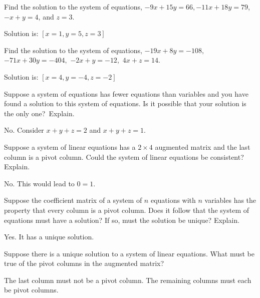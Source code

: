\begin{enumialphparenastyle}
\begin{ex} Find the solution to the system of equations, 
$-9x+15y=66,-11x+18y=79$, $-x+y=4$, and $z=3$.
\begin{sol}
Solution is: $\left[x=1,y=5,z=3\right] $
\end{sol}
\end{ex}

\begin{ex} Find the solution to the system of equations, $-19x+8y=-108,$
$-71x+30y=-404,$ $-2x+y=-12,$ $4x+z=14.$
\begin{sol}
Solution is: $\left[ x=4,y=-4,z=-2\right] $
\end{sol}
\end{ex}

\begin{ex} Suppose a system of equations has fewer equations than variables and
you have found a solution to this system of equations. Is it possible that
your solution is the only one?\ Explain.
\begin{sol}
No. Consider $x+y+z=2$ and $x+y+z=1.$
\end{sol}
\end{ex}

\begin{ex} Suppose a system of linear equations has a $2\times 4$ augmented
matrix and the last column is a pivot column. Could the system of linear
equations be consistent? Explain. 
\begin{sol}
 No. This would lead to $0=1.$
\end{sol}
\end{ex}

\begin{ex} Suppose the coefficient matrix of a system of $n$ equations with $n$
variables has the property that every column is a pivot column. Does it
follow that the system of equations must have a solution? If so, must the
solution be unique? Explain. 
\begin{sol}
Yes. It has a unique solution.
\end{sol}
\end{ex}

\begin{ex} Suppose there is a unique solution to a system of linear equations.
What must be true of the pivot columns in the augmented matrix?
\begin{sol}
The last column must not be a pivot column. The remaining columns must each be pivot
columns.
\end{sol}
\end{ex}



\end{enumialphparenastyle}

